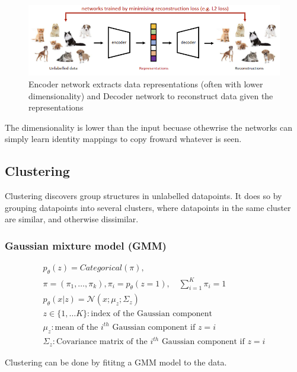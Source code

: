\documentclass[11pt]{article}
\begin{document}
\begin{figure}[H]
    \centering
    \includegraphics[width=\linewidth]{figures/auto-encoder.png}
    \caption{Encoder network extracts data representations (often with lower dimensionality) and Decoder network to reconstruct data given the representations}\label{fig:auto-encoder-1}
\end{figure}

The dimensionality is lower than the input becuase othewrise the networks can simply learn identity mappings to copy froward whatever is seen.

\subsection{Clustering}\label{sect:Clustering}

Clustering discovers group structures in unlabelled datapoints. It does so by grouping datapoints into several clusters, where datapoints in the same cluster are similar, and otherwise dissimilar.

\subsubsection{Gaussian mixture model (GMM)}\label{sect:Gaussian mixture model (GMM)}

\begin{gather}
    p_\theta(z)=Categorical(\pi), \\
    \pi = (\pi_1, \dots, \pi_k), \pi_i = p_\theta(z=1), \quad \sum^K_{i=1}\pi_i = 1 \\
    p_\theta(x|z) = \mathcal{N}(x;\mu_z; \Sigma_z) \\
    \nonumber z \in \{1, \dots K\}: \text{index of the Gaussian component} \\
    \nonumber \mu_z: \text{mean of the $i^{th}$ Gaussian component if $z=i$} \\
    \nonumber \Sigma_z: \text{Covariance matrix of the $i^{th}$ Gaussian component if $z=i$}
\end{gather}

Clustering can be done by fititng a GMM model to the data.
\end{document}

